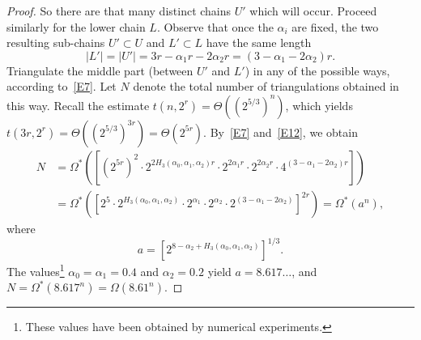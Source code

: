 \documentclass[11pt]{article}
\begin{document}
\begin{proof}
So there are that many distinct chains $U'$ which will occur.
Proceed similarly for the lower chain $L$. Observe that once the $\alpha_i$
are fixed, the two resulting sub-chains $U' \subset U$ and $L' \subset L$
have the same length
\begin{equation} \label{E12}
|L'|=|U'|=3r-\alpha_1 r - 2\alpha_2 r =(3-\alpha_1 - 2\alpha_2)r.
\end{equation}
Triangulate the middle part (between $U'$ and $L'$) in any of the
possible ways, according to~\eqref{E7}. Let $N$ denote the total
number of triangulations obtained in this way.
Recall the estimate $t(n,2^r) =\Theta((2^{5/3})^n)$, which yields
$t(3r,2^r) =\Theta((2^{5/3})^{3r})=\Theta(2^{5r})$.
By~\eqref{E7} and~\eqref{E12}, we obtain
\begin{align*} \label{E13}
N &= \Omega^* \left( \left[ (2^{5r})^2 \cdot
2^{2H_3(\alpha_0,\alpha_1,\alpha_2)r} \cdot 2^{2\alpha_1 r} \cdot 2^{2\alpha_2 r}
\cdot 4^{(3-\alpha_1 - 2\alpha_2)r} \right] \right) \nonumber \\
&= \Omega^* \left(
\left[ 2^{5} \cdot 2^{H_3(\alpha_0,\alpha_1,\alpha_2)}
\cdot 2^{\alpha_1} \cdot 2^{\alpha_2} \cdot 2^{(3-\alpha_1- 2\alpha_2)}
\right]^{2r} \right) =
\Omega^* \left( a^n \right),
\end{align*}
where
$$ a=\left[ 2^{8-\alpha_2+H_3(\alpha_0,\alpha_1,\alpha_2)} \right]^{1/3}. $$
The values\footnote{These values have been obtained by numerical
experiments.} $\alpha_0=\alpha_1=0.4$ and $\alpha_2=0.2$ yield
$a= 8.617\ldots$, and $N = \Omega^*(8.617^n)=\Omega(8.61^n)$.



\end{proof}
\end{document}
